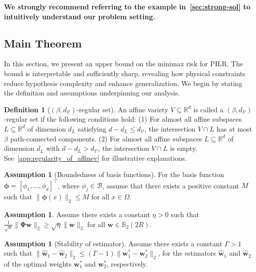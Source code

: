 \documentclass{article}
\theoremstyle{plain}
\theoremstyle{definition}
\newtheorem{definition}[theorem]{Definition}
\newtheorem{assumption}[theorem]{Assumption}
\theoremstyle{remark}
\begin{document}
\textbf{We strongly recommend referring to the example in~\cref{sec:strong-sol} to intuitively understand our problem setting.}

\subsection{Main Theorem}
\label{sec:main-theorem}
In this section, we present an upper bound on the minimax risk for PILR. 
The bound is interpretable and sufficiently sharp, revealing how physical constraints reduce hypothesis complexity and enhance generalization.
We begin by stating the definition and assumptions underpinning our analysis.
\begin{definition}[$(\beta,d_{\mathcal V})$-regular set]
An affine variety \(V \subseteq \mathbb{R}^d\) is called a \((\beta, d_{\mathcal V})\)-regular set if the following conditions hold: (1) For almost all affine subspaces \(L \subseteq \mathbb{R}^d\) of dimension \(d_L\) satisfying \(d - d_L \leq d_{\mathcal V}\), the intersection \(V \cap L\) has at most \(\beta\) path-connected components. (2) For almost all affine subspaces \(L \subseteq \mathbb{R}^d\) of dimension \(d_L\) with \(d - d_L > d_{\mathcal V}\), the intersection \(V \cap L\) is empty. See~\cref{app:regularity_of_affinev} for illustrative explanations.
\end{definition}
\begin{assumption}[Boundedness of basis functions]
\label{asm:bounded_phi}
For the basis function $\bm{\phi} = [\phi_1, \ldots, \phi_d]^{\top}$, where $\phi_j \in \mathcal{B}$, assume that there exists a positive constant $M$ such that $\| \bm{\phi}(x) \|_2 \leq M$ for all $x \in \Omega$.
\end{assumption}
\begin{assumption}
\label{asm:lowereig}
Assume there exists a constant $\eta > 0$ such that $ \frac{1}{\sqrt{n}} \|\bm{\Phi}\bm{w}\|_2 \geq \sqrt{\eta} \|\bm{w}\|_2 $ for all $\bm{w} \in \mathbb{B}_2(2R)$.
\end{assumption}
\begin{assumption}[Stability of estimator]
\label{asm:stability_est}
Assume there exists a constant $\Gamma > 1$ such that $\| \hat{\bm{w}}_1 - \hat{\bm{w}}_2 \|_2 \leq (\Gamma - 1) \| \bm{w}_1^* - \bm{w}_2^* \|_2$, for the estimators $\hat{\bm{w}}_1$ and $\hat{\bm{w}}_2$ of the optimal weights $\bm{w}_1^*$ and $\bm{w}_2^*$, respectively.
\end{assumption}
\end{document}
